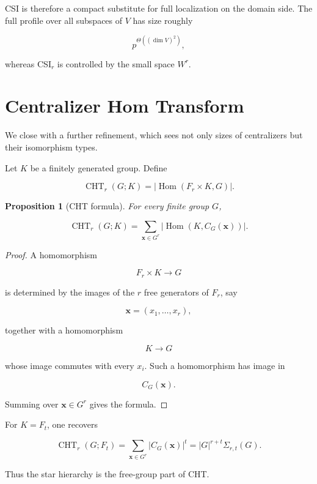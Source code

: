 \documentclass[11pt]{article}
\newtheorem{proposition}[theorem]{Proposition}
\begin{document}
CSI is therefore a compact substitute for full localization on the domain side. The full profile over all subspaces of $V$ has size roughly

\[
p^{\Theta((\dim V)^2)},
\]

whereas CSI$_r$ is controlled by the small space $W^r$.

\section{Centralizer Hom Transform}

We close with a further refinement, which sees not only sizes of centralizers but their isomorphism types.

Let $K$ be a finitely generated group. Define

\[
\operatorname{CHT}_r(G;K)
=|\operatorname{Hom}(F_r\times K,G)|.
\]

\begin{proposition}[CHT formula]

For every finite group $G$,

\[
\operatorname{CHT}_r(G;K)=
\sum_{\mathbf x\in G^r}
|\operatorname{Hom}(K,C_G(\mathbf x))|.
\]

\end{proposition}
\begin{proof}

A homomorphism

\[
F_r\times K\to G
\]

is determined by the images of the $r$ free generators of $F_r$, say

\[
\mathbf x=(x_1,\dots,x_r),
\]

together with a homomorphism

\[
K\to G
\]

whose image commutes with every $x_i$. Such a homomorphism has image in

\[
C_G(\mathbf x).
\]

Summing over $\mathbf x\in G^r$ gives the formula.
\end{proof}

For $K=F_t$, one recovers

\[
\operatorname{CHT}_r(G;F_t)
=\sum_{\mathbf x\in G^r}|C_G(\mathbf x)|^t
=|G|^{r+t}\Sigma_{r,t}(G).
\]

Thus the star hierarchy is the free-group part of CHT.
\end{document}
